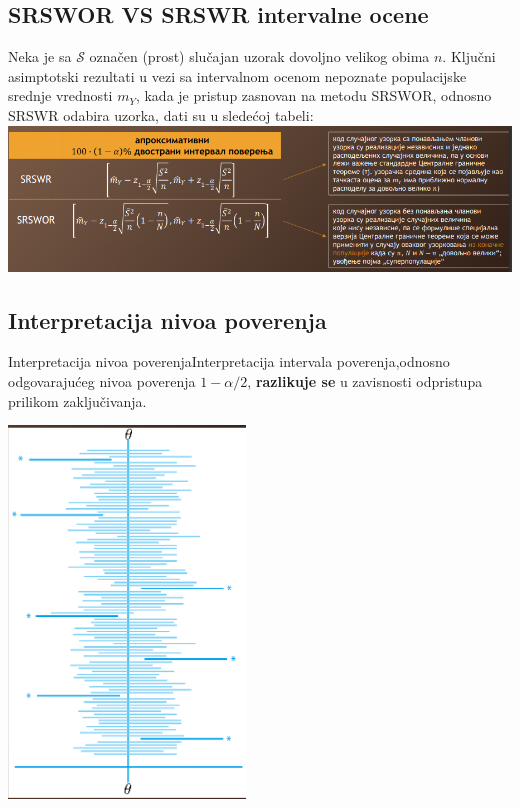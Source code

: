 \documentclass[10pt,a4paper,]{article}
\begin{document}
\subsection{SRSWOR VS SRSWR intervalne ocene}
Neka je sa $\mathcal{S}$ označen (prost) slučajan uzorak dovoljno velikog obima $n$. 
Ključni asimptotski 
rezultati u vezi sa intervalnom ocenom nepoznate populacijske srednje vrednosti $m_Y$, 
kada je 
pristup zasnovan na metodu SRSWOR, odnosno SRSWR odabira uzorka, dati su u sledećoj 
tabeli:\\
\includegraphics[scale=0.4]{primer10.png}


\subsection{Interpretacija nivoa poverenja}
\begin{multicols}{2}
Interpretacija nivoa poverenjaInterpretacija intervala poverenja,odnosno odgovarajućeg 
nivoa poverenja $1-\alpha/2$, \textbf{razlikuje se} u zavisnosti odpristupa prilikom zaključivanja.

\includegraphics[scale=0.5]{primer11.png}
\end{multicols}
\end{document}
